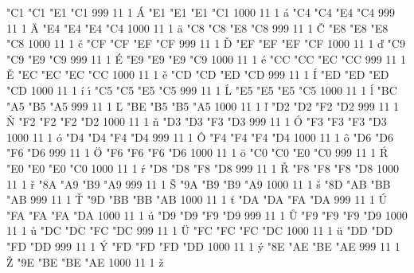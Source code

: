 
  

\setcharcode  "C1  "C1  "E1  "C1   999  11  1  \texaccent \'A
\setcharcode  "E1  "E1  "E1  "C1  1000  11  1  \texaccent \'a
\setcharcode  "C4  "C4  "E4  "C4   999  11  1  \texaccent \"A
\setcharcode  "E4  "E4  "E4  "C4  1000  11  1  \texaccent \"a
\setcharcode  "C8  "C8  "E8  "C8   999  11  1  \texaccent \v C
\setcharcode  "E8  "E8  "E8  "C8  1000  11  1  \texaccent \v c
\setcharcode  "CF  "CF  "EF  "CF   999  11  1  \texaccent \v D
\setcharcode  "EF  "EF  "EF  "CF  1000  11  1  \texaccent \v d
\setcharcode  "C9  "C9  "E9  "C9   999  11  1  \texaccent \'E
\setcharcode  "E9  "E9  "E9  "C9  1000  11  1  \texaccent \'e
\setcharcode  "CC  "CC  "EC  "CC   999  11  1  \texaccent \v E
\setcharcode  "EC  "EC  "EC  "CC  1000  11  1  \texaccent \v e
\setcharcode  "CD  "CD  "ED  "CD   999  11  1  \texaccent \'I
\setcharcode  "ED  "ED  "ED  "CD  1000  11  1  \texaccent \'i  \texaccent \'\i
\setcharcode  "C5  "C5  "E5  "C5   999  11  1  \texaccent \'L
\setcharcode  "E5  "E5  "E5  "C5  1000  11  1  \texaccent \'l
\setcharcode  "BC  "A5  "B5  "A5   999  11  1  \texaccent \v L
\setcharcode  "BE  "B5  "B5  "A5  1000  11  1  \texaccent \v l
\setcharcode  "D2  "D2  "F2  "D2   999  11  1  \texaccent \v N
\setcharcode  "F2  "F2  "F2  "D2  1000  11  1  \texaccent \v n
\setcharcode  "D3  "D3  "F3  "D3   999  11  1  \texaccent \'O
\setcharcode  "F3  "F3  "F3  "D3  1000  11  1  \texaccent \'o
\setcharcode  "D4  "D4  "F4  "D4   999  11  1  \texaccent \^O
\setcharcode  "F4  "F4  "F4  "D4  1000  11  1  \texaccent \^o
\setcharcode  "D6  "D6  "F6  "D6   999  11  1  \texaccent \"O
\setcharcode  "F6  "F6  "F6  "D6  1000  11  1  \texaccent \"o
\setcharcode  "C0  "C0  "E0  "C0   999  11  1  \texaccent \'R
\setcharcode  "E0  "E0  "E0  "C0  1000  11  1  \texaccent \'r
\setcharcode  "D8  "D8  "F8  "D8   999  11  1  \texaccent \v R
\setcharcode  "F8  "F8  "F8  "D8  1000  11  1  \texaccent \v r
\setcharcode  "8A  "A9  "B9  "A9   999  11  1  \texaccent \v S
\setcharcode  "9A  "B9  "B9  "A9  1000  11  1  \texaccent \v s
\setcharcode  "8D  "AB  "BB  "AB   999  11  1  \texaccent \v T
\setcharcode  "9D  "BB  "BB  "AB  1000  11  1  \texaccent \v t
\setcharcode  "DA  "DA  "FA  "DA   999  11  1  \texaccent \'U
\setcharcode  "FA  "FA  "FA  "DA  1000  11  1  \texaccent \'u
\setcharcode  "D9  "D9  "F9  "D9   999  11  1  \texaccent \r U
\setcharcode  "F9  "F9  "F9  "D9  1000  11  1  \texaccent \r u
\setcharcode  "DC  "DC  "FC  "DC   999  11  1  \texaccent \"U
\setcharcode  "FC  "FC  "FC  "DC  1000  11  1  \texaccent \"u
\setcharcode  "DD  "DD  "FD  "DD   999  11  1  \texaccent \'Y
\setcharcode  "FD  "FD  "FD  "DD  1000  11  1  \texaccent \'y
\setcharcode  "8E  "AE  "BE  "AE   999  11  1  \texaccent \v Z
\setcharcode  "9E  "BE  "BE  "AE  1000  11  1  \texaccent \v z

